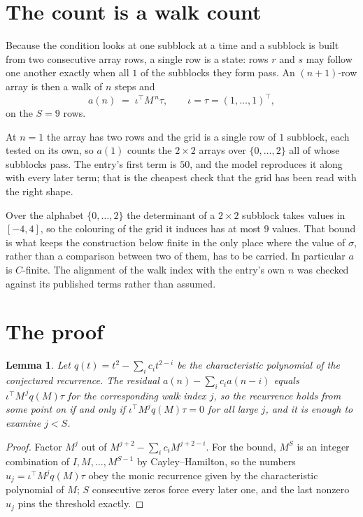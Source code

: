 \documentclass[11pt,a4paper]{article}
\theoremstyle{plain}
\newtheorem{lemma}[theorem]{Lemma}
\theoremstyle{definition}
\begin{document}
\section{The count is a walk count}

Because the condition looks at one subblock at a time and a subblock is
built from two consecutive array rows, a single row is a state: rows $r$ and $s$ may follow one
another exactly when all $1$ of the subblocks they form pass. An $(n+1)$-row array is then a
walk of $n$ steps and
\[
a(n)\;=\;\iota^{\!\top}M^{\,n}\tau,\qquad\iota=\tau=(1,\dots,1)^{\!\top},
\]
on the $S=9$ rows.

At $n=1$ the array has two rows and the grid is a single row of $1$
subblock, each tested on its own, so $a(1)$ counts the
$2\times2$ arrays over $\{0,\dots,2\}$ all of whose subblocks pass. The entry's
first term is $50$, and the model reproduces it along with every later term; that is the
cheapest check that the grid has been read with the right shape.

Over the alphabet $\{0,\dots,2\}$ the determinant of a $2\times2$ subblock takes values in
$[-4,4]$, so the colouring of the grid it induces has at most $9$ values.
That bound is what keeps the construction below finite in the only place where the value of
$\sigma$, rather than a comparison between two of them, has to be carried.
In particular $a$ is $C$-finite. The alignment of the walk index with the entry's own $n$ was
checked against its published terms rather than assumed.

\section{The proof}

\begin{lemma}\label{lem:crit}
Let $q(t)=t^{2}-\sum_i c_it^{2-i}$ be the characteristic polynomial of the
conjectured recurrence. The residual $a(n)-\sum_ic_ia(n-i)$ equals
$\iota^{\!\top}M^{\,j}q(M)\tau$ for the corresponding walk index $j$, so the recurrence
holds from some point on if and only if $\iota^{\!\top}M^{j}q(M)\tau=0$ for all large $j$,
and it is enough to examine $j<S$.
\end{lemma}

\begin{proof}
Factor $M^{j}$ out of $M^{j+2}-\sum_ic_iM^{j+2-i}$. For the bound, $M^{S}$
is an integer combination of $I,M,\dots,M^{S-1}$ by Cayley--Hamilton, so the numbers
$u_j=\iota^{\!\top}M^{j}q(M)\tau$ obey the monic recurrence given by the characteristic
polynomial of $M$; $S$ consecutive zeros force every later one, and the last nonzero $u_j$
pins the threshold exactly.
\end{proof}
\end{document}
